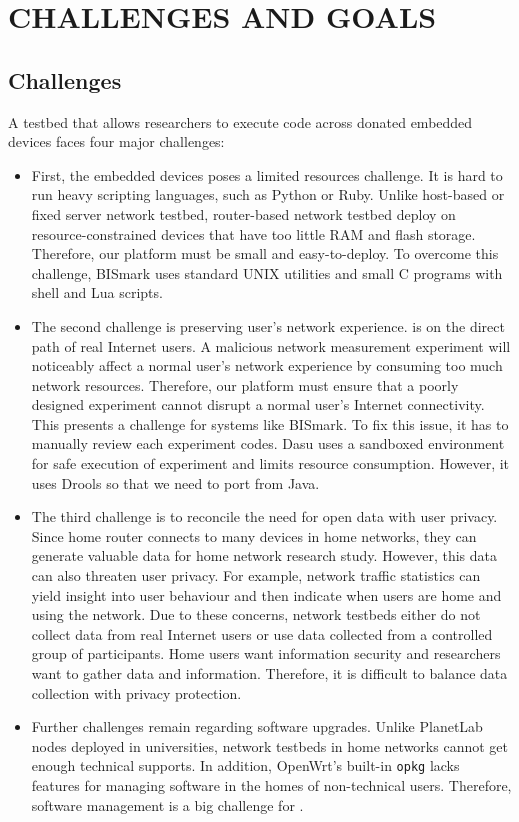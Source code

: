 \chapter{CHALLENGES AND GOALS}
\label{sec.goals_challenges}
\section{Challenges}
\label{ssec.challenges}
A testbed that allows researchers to execute code across donated embedded devices faces four major challenges: 
\begin{itemize}
\item First, the embedded devices poses a limited resources challenge. It is hard to run heavy scripting languages, such as Python or Ruby. Unlike host-based or fixed server network testbed, router-based network testbed deploy on resource-constrained devices that have too little RAM and flash storage. Therefore, our platform must be small and easy-to-deploy. To overcome this challenge, BISmark uses standard UNIX utilities and small C programs with shell and Lua scripts.  
\item The second challenge is preserving user's network experience. \sysname is on the direct path of real Internet users. A malicious network measurement experiment will noticeably affect a normal user's network experience by consuming too much network resources. Therefore, our platform must ensure that a poorly designed experiment cannot disrupt a normal user's Internet connectivity. This presents a challenge for systems like BISmark. To fix this issue, it has to manually review each experiment codes. Dasu uses a sandboxed environment for safe execution of experiment and limits resource consumption. However, it uses Drools so that we need to port from Java.
\item The third challenge is to reconcile the need for open data with user privacy. Since home router connects to many devices in home networks, they can generate valuable data for home network research study. However, this data can also threaten user privacy. For example, network traffic statistics can yield insight into user behaviour and then indicate when users are home and using the network. Due to these concerns, network testbeds either do not collect data from real Internet users or use data collected from a controlled group of participants. Home users want information security and researchers want to gather data and information. Therefore, it is difficult to balance data collection with privacy protection.
\item Further challenges remain regarding software upgrades. Unlike PlanetLab nodes deployed in universities, network testbeds in home networks cannot get enough technical supports. In addition, OpenWrt's built-in \texttt{opkg} lacks features for managing software in the homes of non-technical users. Therefore, software management is a big challenge for \sysname.  
\end{itemize}
